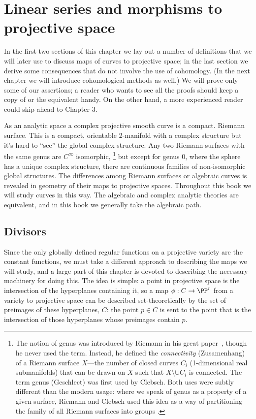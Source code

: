 

\chapter{Linear series and morphisms to projective space}\label{linear series}

In the first two sections of this chapter we lay out a number of definitions that we will later use to discuss
maps of curves to projective space; in the last section we derive some consequences that do not involve the
use of cohomology. (In the next chapter we will introduce cohomological methods as well.) We will prove only some of our assertions; a reader who wants to see all the proofs should keep a copy of \cite{Hartshorne1977} or the equivalent handy. On the other hand, a more experienced reader
could skip ahead to Chapter 3.

As an analytic space a complex projective smooth curve is a compact. Riemann surface. This is a compact, orientable 2-manifold with a complex structure but it's hard to ``see'' the global complex structure. Any two Riemann surfaces with the same genus are $C^\infty$ isomorphic,
\footnote{The notion of genus was introduced by Riemann in his great paper~\cite{Riemann}, though he never used the term. Instead,
he defined the \emph{connectivity} (Zusamenhang) of a Riemann surface $X$---the number of closed curves $C_i$ (1-dimensional real submanifolds) that can be drawn on $X$ such that $X\setminus \cup C_i$ is connected. The term genus (Geschlect) was first used by Clebsch. Both uses
were subtly different than the modern usage: where we speak of genus as a property of a given surface, Riemann and Clebsch
used this idea as a way of partitioning the family of all Riemann surfaces into groups \cite{MR4175877}. }
but except for genus 0, where the sphere has a unique complex structure,
there are continuous families of non-isomorphic global structures.  The differences among Riemann surfaces or algebraic curves is revealed in  geometry of their maps to projective spaces. Throughout this book we will study curves in this way. The algebraic and
complex analytic theories are equivalent, and in this book we generally take the algebraic path.

\section{Divisors}

Since the only  globally defined regular functions on a projective variety are the constant functions, we must take a different approach to describing the maps we will study, and a large part of this chapter is devoted to describing the necessary machinery for doing this. The idea is simple: a point in projective space is the intersection of the hyperplanes containing it, so a map $\phi: C\to \PP^r$ from a variety to projective space can be described set-theoretically
by the set of preimages of these hyperplanes, $C$: the point $p\in C$ is sent to the point
that is the intersection of those hyperplanes whose preimages contain $p$.
 

